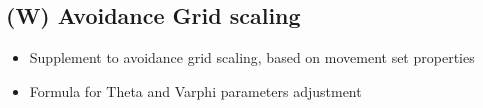 \subsection{(W) Avoidance Grid scaling}\label{s:avoidanceGridScaling}
    \begin{itemize}
        \item Supplement to avoidance grid scaling, based on movement set properties 
        \item Formula for Theta and Varphi parameters adjustment
    \end{itemize}
    
